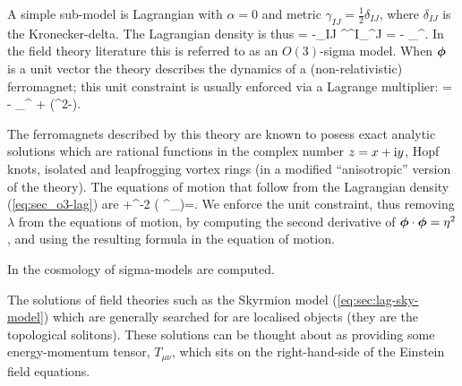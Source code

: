 A simple sub-model is Lagrangian with $\alpha=0$ and metric $\gamma_{IJ} =  \tfrac{1}{2}\delta_{IJ}$, where $\delta_{IJ}$ is the Kronecker-delta. The Lagrangian density is thus
\bea
\ld = -\delta_{IJ} \partial^{\mu}\phi^I\partial_{\mu}\phi^J = - \partial_{\mu}\gbm{\phi}\cdot\partial^{\mu}\gbm{\phi}.
\eea
In the field theory literature this is referred to as an $O(3)$-sigma model. When $\bm{\phi}$ is a unit vector the theory describes the dynamics of a (non-relativistic) ferromagnet; this unit constraint is usually enforced via a Lagrange multiplier:
\bea
\label{eq:sec_o3-lag}
\ld =  - \partial_{\mu}\gbm{\phi}\cdot\partial^{\mu}\gbm{\phi} + \lambda\left(\eta^2-\gbm{\phi}\cdot\gbm{\phi}\right).
\eea

The ferromagnets described by this theory are known to posess exact analytic solutions which are rational functions in the complex number $z = x + \textrm{i} y$, Hopf knots,  isolated and leapfrogging vortex rings (in a modified ``anisotropic'' version of the theory). The equations of motion that follow from the Lagrangian density (\ref{eq:sec_o3-lag}) are
\bea
\square\gbm{\phi} +\eta^{-2} \left( \nabla^{\mu}\gbm{\phi}\cdot\nabla_{\mu}\gbm{\phi}\right)\gbm{\phi}=.
\eea
We enforce the unit constraint, thus removing $\lambda$ from the equations of motion, by computing the second derivative of $\bm{\phi}\cdot\bm{\phi}=\eta^2$, and using the resulting formula in the equation of motion. 

In \cite{Shchigolev:2013gfa} the cosmology of sigma-models are computed.

The solutions of field theories such as the Skyrmion model (\ref{eq:sec:lag-sky-model}) which are generally searched for are  localised objects (they are the topological solitons). These solutions can be thought about as providing some energy-momentum tensor, $T_{\mu\nu}$, which sits on the right-hand-side of the Einstein field equations.

